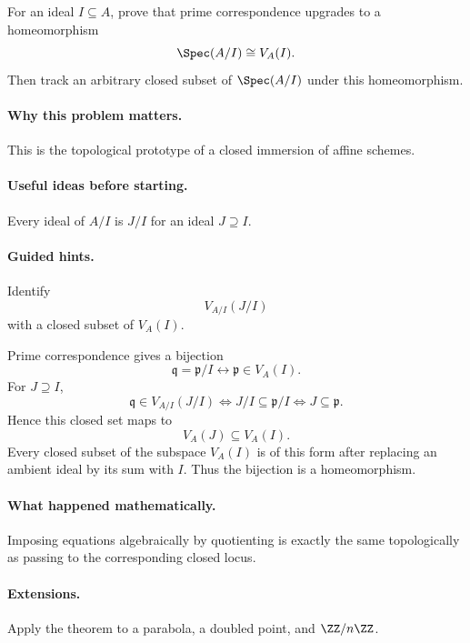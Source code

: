 \begin{problem}
For an ideal $I\subseteq A$, prove that prime correspondence upgrades to a homeomorphism
\[
\Spec(A/I)\cong V_A(I).
\]
Then track an arbitrary closed subset of $\Spec(A/I)$ under this homeomorphism.
\end{problem}

\paragraph{Why this problem matters.}
This is the topological prototype of a closed immersion of affine schemes.

\paragraph{Useful ideas before starting.}
Every ideal of $A/I$ is $J/I$ for an ideal $J\supseteq I$.

\paragraph{Guided hints.}
Identify
\[
V_{A/I}(J/I)
\]
with a closed subset of $V_A(I)$.

\begin{solution}
Prime correspondence gives a bijection
\[
\mathfrak q=\mathfrak p/I
\longleftrightarrow
\mathfrak p\in V_A(I).
\]
For $J\supseteq I$,
\[
\mathfrak q\in V_{A/I}(J/I)
\iff
J/I\subseteq\mathfrak p/I
\iff
J\subseteq\mathfrak p.
\]
Hence this closed set maps to
\[
V_A(J)\subseteq V_A(I).
\]
Every closed subset of the subspace $V_A(I)$ is of this form after replacing an ambient ideal
by its sum with $I$.  Thus the bijection is a homeomorphism.
\end{solution}

\paragraph{What happened mathematically.}
Imposing equations algebraically by quotienting is exactly the same topologically as passing
to the corresponding closed locus.

\paragraph{Extensions.}
Apply the theorem to a parabola, a doubled point, and $\ZZ/n\ZZ$.
